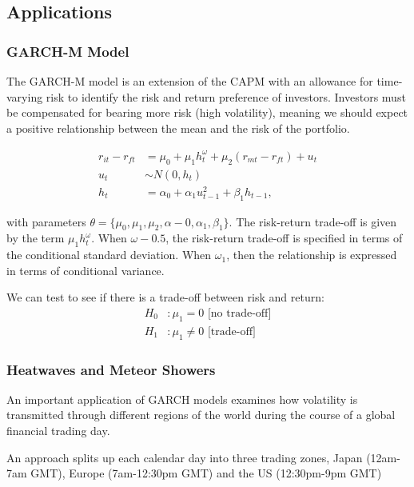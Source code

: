 \documentclass[11pt]{article}
\begin{document}
\subsection{Applications}

\subsubsection{GARCH-M Model}

The GARCH-M model is an extension of the CAPM with an allowance for time-varying risk to identify the risk and return preference of investors. Investors must be compensated for bearing more risk (high volatility), meaning we should expect a positive relationship between the mean and the risk of the portfolio.

\begin{equation}
\begin{aligned}
r_{i t}-r_{f t} & =\mu_0+\mu_1 h_t^\omega+\mu_2\left(r_{m t}-r_{f t}\right)+u_t \\
u_t & \sim N\left(0, h_t\right) \\
h_t & =\alpha_0+\alpha_1 u_{t-1}^2+\beta_1 h_{t-1},
\end{aligned}
\end{equation}

with parameters $\theta = \{\mu_0, \mu_1, \mu_2, \alpha-0, \alpha_1, \beta_1\}$. The risk-return trade-off is given by the term $\mu_1 h_t^\omega$. When $\omega-0.5$, the risk-return trade-off is specified in terms of the conditional standard deviation. When $\omega_1$, then the relationship is expressed in terms of conditional variance.

We can test to see if there is a trade-off between risk and return:
\begin{align*}
    H_0&: \mu_1 = 0 \text{ [no trade-off]} \\
    H_1&: \mu_1 \neq0 \text{ [trade-off]}
\end{align*}

\subsubsection{Heatwaves and Meteor Showers}

An important application of GARCH models examines how volatility is transmitted through different regions of the world during the course of a global financial trading day.

An approach splits up each calendar day into three trading zones, Japan (12am-7am GMT), Europe (7am-12:30pm GMT) and the US (12:30pm-9pm GMT)
\end{document}
